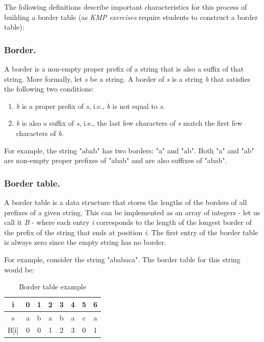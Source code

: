 \documentclass{l4proj}
\begin{document}
The following definitions describe important characteristics for this process of building a border table (as \emph{KMP exercises} require students to construct a border table):
\subsubsection{Border.}

A border is a non-empty proper prefix of a string that is also a suffix of that string. More formally, let \emph{s} be a string. A border of \emph{s} is a string \emph{b} that satisfies the following two conditions:
\begin{enumerate}
	\item
	\emph{b} is a proper prefix of \emph{s}, i.e., \emph{b} is not equal to \emph{s}.
	\item
	\emph{b} is also a suffix of \emph{s}, i.e., the last few characters of \emph{s} match the first few characters of \emph{b}.
\end{enumerate}
For example, the string "abab" has two borders: "a" and "ab". Both "a" and "ab" are non-empty proper prefixes of "abab" and are also suffixes of "abab".

\subsubsection{Border table.}

A border table is a data structure that stores the lengths of the borders of all prefixes of a given string. This can be implemented as an array of integers - let us call it \emph{B} - where each entry \emph{i} corresponds to the length of the longest border of the prefix of the string that ends at position \emph{i}. The first entry of the border table is always zero since the empty string has no border.

For example, consider the string "ababaca". The border table for this string would be:

\begin{table}[!h]
\begin{center}
\begin{tabular}{|c||c|c|c|c|c|c|c|}
	\hline
	i & 0 & 1 & 2 & 3 & 4 & 5 & 6 \\
	\hline
	s & a & b & a & b & a & c & a \\
	\hline
	B[i] & 0 & 0 & 1 & 2 & 3 & 0 & 1 \\ 
	\hline
\end{tabular}
\caption{\label{tab:b-table}Border table example}
\end{center}
\end{table}
\end{document}
